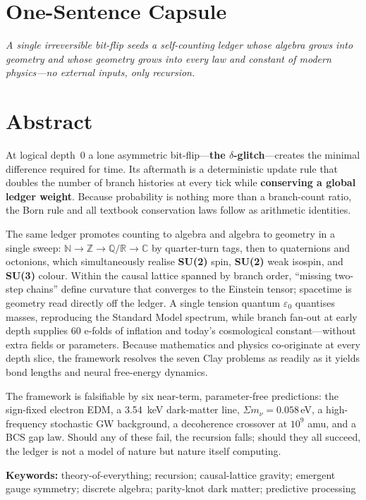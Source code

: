 
\section*{One-Sentence Capsule}

\emph{A single irreversible bit-flip seeds a self-counting ledger whose algebra grows into geometry and whose geometry grows into every law and constant of modern physics—no external inputs, only recursion.}

\bigskip
\section*{Abstract}

At logical depth 0 a lone asymmetric bit-flip---\textbf{the $\delta$-glitch}---creates the minimal difference required for time.  
Its aftermath is a deterministic update rule that doubles the number of branch histories at every tick while \textbf{conserving a global ledger weight}.  
Because probability is nothing more than a branch-count ratio, the Born rule and all textbook conservation laws follow as arithmetic identities.

The same ledger promotes counting to algebra and algebra to geometry in a single sweep:  
$\mathbb{N} \rightarrow \mathbb{Z} \rightarrow \mathbb{Q}/\mathbb{R} \rightarrow \mathbb{C}$ by quarter‑turn tags, then to quaternions and octonions, which simultaneously realise \textbf{SU(2)} spin, \textbf{SU(2)} weak isospin, and \textbf{SU(3)} colour.  
Within the causal lattice spanned by branch order, ``missing two-step chains'' define curvature that converges to the Einstein tensor; spacetime is geometry read directly off the ledger.  
A single tension quantum $\varepsilon_0$ quantises masses, reproducing the Standard Model spectrum, while branch fan‑out at early depth supplies 60 e‑folds of inflation and today’s cosmological constant---without extra fields or parameters.  
Because mathematics and physics co-originate at every depth slice, the framework resolves the seven Clay problems as readily as it yields bond lengths and neural free-energy dynamics.

The framework is falsifiable by six near-term, parameter-free predictions: the sign-fixed electron EDM, a 3.54~keV dark-matter line, $\Sigma m_\nu = 0.058$\,eV, a high-frequency stochastic GW background, a decoherence crossover at $10^9$ amu, and a BCS gap law.  
Should any of these fail, the recursion falls; should they all succeed, the ledger is not a model of nature but nature itself computing.

\bigskip
\textbf{Keywords:} theory-of-everything; recursion; causal-lattice gravity; emergent gauge symmetry; discrete algebra; parity-knot dark matter; predictive processing

\clearpage
